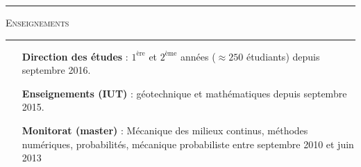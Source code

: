 \documentclass[a4paper,11pt]{article}
\newcommand{\titre}[1]{
  \begin{center}
    \rule{0.4\textwidth}{0.5pt}
    \par\vspace{0.1cm}
    \textsc{\large #1}
    \par\vspace{-0.2cm}
    \par\noindent\rule{0.4\textwidth}{0.5pt}
  \end{center}
}
\begin{document}
\titre{Enseignements}
\begin{itemize}
  \item[\bf Direction des études] : $1^\text{ère}$ et $2^\text{ème}$ années ($\approx 250$ étudiants) depuis septembre 2016.
  \item[\bf Enseignements (IUT)] : géotechnique et mathématiques depuis septembre 2015.
  \item[\bf Monitorat (master)] : Mécanique des milieux continus, méthodes numériques, probabilités, mécanique probabiliste entre septembre 2010 et juin 2013
\end{itemize}
\vfill
\empty
\end{document}
